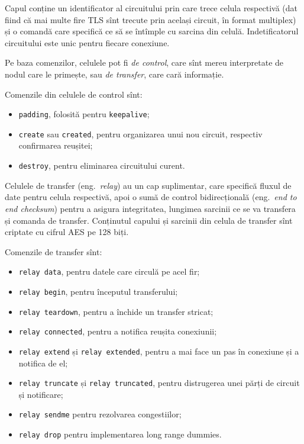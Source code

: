Capul conține un identificator al circuitului prin care trece celula respectivă
(dat fiind că mai multe fire TLS sînt trecute prin același circuit, în format
multiplex) și o comandă care specifică ce să se întîmple cu sarcina
din celulă. Indetificatorul circuitului este unic pentru fiecare conexiune.

Pe baza comenzilor, celulele pot fi \emph{de control}, care sînt mereu
interpretate de nodul care le primește, sau \emph{de transfer}, care
cară informație.  

Comenzile din celulele de control sînt:
\begin{itemize}
  \item \texttt{padding}, folosită pentru \texttt{keepalive};
  \item \texttt{create} sau \texttt{created}, pentru organizarea unui
    nou circuit, respectiv confirmarea reușitei;
  \item \texttt{destroy}, pentru eliminarea circuitului curent.
\end{itemize}

Celulele de transfer (eng.\ \emph{relay}) au un cap suplimentar, care
specifică fluxul de date pentru celula respectivă, apoi o sumă de
control bidirecțională (eng.\ \emph{end to end checksum}) pentru a
asigura integritatea, lungimea sarcinii ce se va transfera și comanda
de transfer. Conținutul capului și sarcinii din celula de transfer
sînt criptate cu cifrul AES pe 128 biți.

Comenzile de transfer sînt:
\begin{itemize}
  \item \texttt{relay data}, pentru datele care circulă pe acel fir;
  \item \texttt{relay begin}, pentru începutul transferului;
  \item \texttt{relay teardown}, pentru a închide un transfer stricat;
  \item \texttt{relay connected}, pentru a notifica reușita conexiunii;
  \item \texttt{relay extend} și \texttt{relay extended}, pentru a mai
    face un pas în conexiune și a notifica de el;
  \item \texttt{relay truncate} și \texttt{relay truncated}, pentru distrugerea
    unei părți de circuit și notificare;
  \item \texttt{relay sendme} pentru rezolvarea congestiilor;
  \item \texttt{relay drop} pentru implementarea {\color{red} long range dummies}.
\end{itemize}


